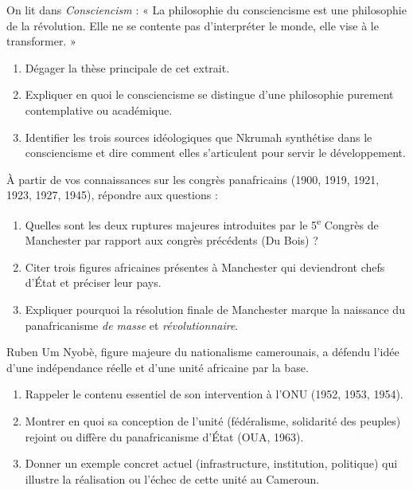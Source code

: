 \documentclass[11pt]{article}
\newcounter{popsec}
\newcounter{popsub}
\newcommand{\courssub}[1]{%
  \stepcounter{popsub}%
  \par\vspace{9pt}\noindent{\popxbold\fontsize{11.5}{13}\selectfont\color{popink}{\color{poporange}\thepopsec.\thepopsub}\hspace{6pt}#1}\par\nopagebreak\vspace{4pt}
}
\begin{document}
\courssub{Je m'entraîne}

\begin{exercice}
On lit dans \emph{Consciencism} : « La philosophie du consciencisme est une philosophie de la révolution. Elle ne se contente pas d'interpréter le monde, elle vise à le transformer. »
\begin{enumerate}
\item Dégager la thèse principale de cet extrait.
\item Expliquer en quoi le consciencisme se distingue d'une philosophie purement contemplative ou académique.
\item Identifier les trois sources idéologiques que Nkrumah synthétise dans le consciencisme et dire comment elles s'articulent pour servir le développement.
\end{enumerate}
\end{exercice}

\begin{exercice}
À partir de vos connaissances sur les congrès panafricains (1900, 1919, 1921, 1923, 1927, 1945), répondre aux questions :
\begin{enumerate}
\item Quelles sont les deux ruptures majeures introduites par le 5\textsuperscript{e} Congrès de Manchester par rapport aux congrès précédents (Du Bois) ?
\item Citer trois figures africaines présentes à Manchester qui deviendront chefs d'État et préciser leur pays.
\item Expliquer pourquoi la résolution finale de Manchester marque la naissance du panafricanisme \emph{de masse} et \emph{révolutionnaire}.
\end{enumerate}
\end{exercice}

\begin{exercice}
Ruben Um Nyobè, figure majeure du nationalisme camerounais, a défendu l'idée d'une indépendance réelle et d'une unité africaine par la base.
\begin{enumerate}
\item Rappeler le contenu essentiel de son intervention à l'ONU (1952, 1953, 1954).
\item Montrer en quoi sa conception de l'unité (fédéralisme, solidarité des peuples) rejoint ou diffère du panafricanisme d'État (OUA, 1963).
\item Donner un exemple concret actuel (infrastructure, institution, politique) qui illustre la réalisation ou l'échec de cette unité au Cameroun.
\end{enumerate}
\end{exercice}
\end{document}

